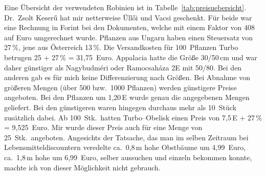 \documentclass[twocolumn]{scrartcl}
\begin{document}
Eine Übersicht der verwendeten Robinien ist in
Tabelle~\ref{tab:preisuebersicht}. Dr.~Zsolt Keserű hat mir netterweise Üllői und Vacsi geschenkt. Für beide war eine Rechnung in Forint
bei den Dokumenten, welche mit einem Faktor von 408 auf Euro
umgerechnet wurde. Pflanzen aus Ungarn haben einen Steuersatz von
27\,\%, jene aus Österreich 13\,\%. Die Versandkosten für 100~Pflanzen Turbo betrugen 25 +
27\,\% = 31,75~Euro. Appalacia hatte die Größe 30/50\,cm und
war daher günstiger als Nagybudméri oder Ramocsaháza 2E mit 50/80. Bei
den anderen gab es für mich keine Differenzierung nach Größen. Bei
Abnahme von größeren Mengen (über 500 bzw.\ 1000 Pflanzen) werden
günstigere Preise angeboten.
Bei den Pflanzen um 1,20\,E wurde genau die angegebenen Mengen geliefert.
Bei den günstigeren waren hingegen durchaus mehr als 10~Stück zusätzlich dabei.
Ab 100~Stk.\ hatten Turbo--Obelisk einen Preis von 7,5\,E +
27\,\% = 9,525~Euro. Mir wurde dieser Preis auch für eine
Menge von 25~Stk.\ angeboten. Angesichts der Tatsache, das man im
selben Zeitraum bei Lebensmitteldiscountern veredelte ca.\ 0,8\,m hohe
Obstbäume um 4,99~Euro, ca.\ 1,8\,m hohe um 6,99~Euro, selber
aussuchen und einzeln bekommen konnte, machte ich von dieser
Möglichkeit nicht gebrauch.

\begin{table}[htbp]
  \centering
  \caption{Übersicht über die verwendeten Robinien}
  \label{tab:preisuebersicht}
\end{table}
\end{document}
